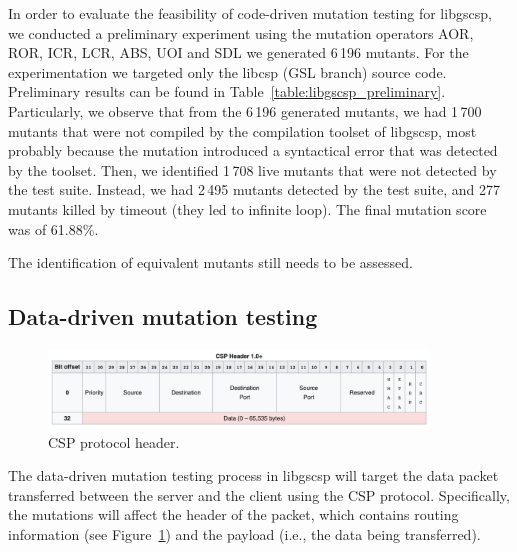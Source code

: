

In order to evaluate the feasibility of code-driven mutation testing for libgscsp, we conducted a preliminary experiment using the mutation operators AOR, ROR, ICR, LCR, ABS, UOI and SDL we generated 6\,196 mutants. For the experimentation we targeted only the libcsp (GSL branch) source code. Preliminary results can be found in Table~\ref{table:libgscsp_preliminary}.
Particularly, we observe that from the 6\,196 generated mutants, we had 1\,700 mutants that were not compiled by the compilation toolset of libgscsp, most probably because the mutation introduced a syntactical error that was detected by the toolset.
Then, we identified 1\,708 live mutants that were not detected by the test suite. Instead, we had 2\,495 mutants detected by the test suite, and 277 mutants killed by timeout (they led to infinite loop). The final mutation score was of 61.88\%.

The identification of equivalent mutants still needs to be assessed.


\subsection{Data-driven mutation testing}
\label{subsec:libgscsp_data}

\begin{figure}[h]
  \centering
    \includegraphics[width=0.9\textwidth]{images/csp_packet}
      \caption{CSP protocol header.}
      \label{fig:csp_packet}
\end{figure}

The data-driven mutation testing process in libgscsp will target the data packet transferred between the server and the client using the CSP protocol. Specifically, the mutations will affect the header of the packet, which contains routing information (see Figure~\ref{fig:csp_packet}) and the payload 
(i.e., the data being transferred).




